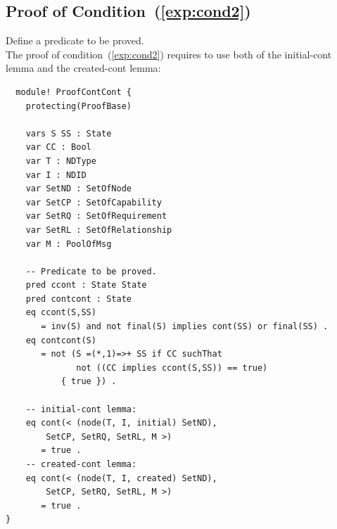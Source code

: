 \documentclass[12pt]{report}
\begin{document}
\subsection{Proof of Condition~(\ref{exp:cond2})}
\label{sec:TOSCAcontcont}
 Define a predicate to be proved. \\ 
The proof of condition~(\ref{exp:cond2}) requires to use both of the
initial-cont lemma and the created-cont lemma:
\small
\begin{verbatim}
  module! ProofContCont {
    protecting(ProofBase)
  
    vars S SS : State
    var CC : Bool
    var T : NDType
    var I : NDID
    var SetND : SetOfNode
    var SetCP : SetOfCapability
    var SetRQ : SetOfRequirement
    var SetRL : SetOfRelationship
    var M : PoolOfMsg
  
    -- Predicate to be proved.
    pred ccont : State State
    pred contcont : State
    eq ccont(S,SS)
       = inv(S) and not final(S) implies cont(SS) or final(SS) .
    eq contcont(S)
       = not (S =(*,1)=>+ SS if CC suchThat
              not ((CC implies ccont(S,SS)) == true)
           { true }) .
  
    -- initial-cont lemma: 
    eq cont(< (node(T, I, initial) SetND), 
  	    SetCP, SetRQ, SetRL, M >)
       = true .
    -- created-cont lemma:
    eq cont(< (node(T, I, created) SetND), 
  	    SetCP, SetRQ, SetRL, M >)
       = true .
}
\end{verbatim}
\normalsize
\end{document}
